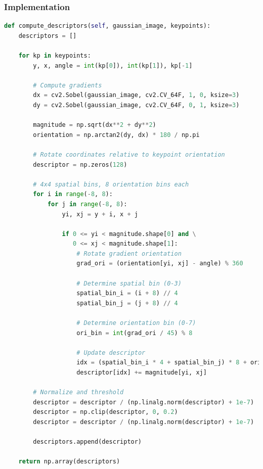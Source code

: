 \documentclass[12pt,a4paper]{article}
\begin{document}
\subsubsection{Implementation}
\begin{lstlisting}[language=Python]
def compute_descriptors(self, gaussian_image, keypoints):
    descriptors = []
    
    for kp in keypoints:
        y, x, angle = int(kp[0]), int(kp[1]), kp[-1]
        
        # Compute gradients
        dx = cv2.Sobel(gaussian_image, cv2.CV_64F, 1, 0, ksize=3)
        dy = cv2.Sobel(gaussian_image, cv2.CV_64F, 0, 1, ksize=3)
        
        magnitude = np.sqrt(dx**2 + dy**2)
        orientation = np.arctan2(dy, dx) * 180 / np.pi
        
        # Rotate coordinates relative to keypoint orientation
        descriptor = np.zeros(128)
        
        # 4x4 spatial bins, 8 orientation bins each
        for i in range(-8, 8):
            for j in range(-8, 8):
                yi, xj = y + i, x + j
                
                if 0 <= yi < magnitude.shape[0] and \
                   0 <= xj < magnitude.shape[1]:
                    # Rotate gradient orientation
                    grad_ori = (orientation[yi, xj] - angle) % 360
                    
                    # Determine spatial bin (0-3)
                    spatial_bin_i = (i + 8) // 4
                    spatial_bin_j = (j + 8) // 4
                    
                    # Determine orientation bin (0-7)
                    ori_bin = int(grad_ori / 45) % 8
                    
                    # Update descriptor
                    idx = (spatial_bin_i * 4 + spatial_bin_j) * 8 + ori_bin
                    descriptor[idx] += magnitude[yi, xj]
        
        # Normalize and threshold
        descriptor = descriptor / (np.linalg.norm(descriptor) + 1e-7)
        descriptor = np.clip(descriptor, 0, 0.2)
        descriptor = descriptor / (np.linalg.norm(descriptor) + 1e-7)
        
        descriptors.append(descriptor)
    
    return np.array(descriptors)
\end{lstlisting}
\end{document}
